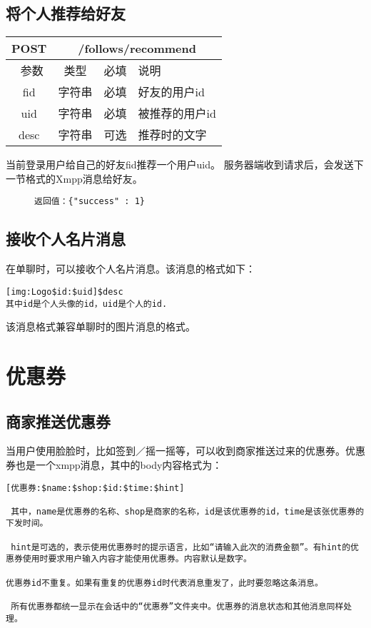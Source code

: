 \subsection{ 将个人推荐给好友}
\begin{table}[H]
   \begin{center}
\begin{tabular}{|c|c|c|p{12cm}|}
\hline
POST & \multicolumn{3}{|c|}{/follows/recommend} \\
\hline\hline
 \  参数  & 类型 & 必填 &  说明  \\
\hline
 fid  & 字符串 & 必填 &  好友的用户id\\
 \hline
 uid  & 字符串 & 必填 &  被推荐的用户id\\
\hline
 desc  & 字符串 & 可选 &  推荐时的文字\\
\hline
\end{tabular}
   \end{center}
\end{table}
当前登录用户给自己的好友fid推荐一个用户uid。
服务器端收到请求后，会发送下一节格式的Xmpp消息给好友。

\begin{figure}[H]
\begin{verbatim}
返回值：{"success" : 1}
\end{verbatim}
\end{figure}


\subsection{接收个人名片消息}
在单聊时，可以接收个人名片消息。该消息的格式如下：
\begin{verbatim}
[img:Logo$id:$uid]$desc
其中id是个人头像的id，uid是个人的id.
\end{verbatim}
该消息格式兼容单聊时的图片消息的格式。


\section{优惠券}

\subsection{商家推送优惠券}
当用户使用脸脸时，比如签到／摇一摇等，可以收到商家推送过来的优惠券。优惠券也是一个xmpp消息，其中的body内容格式为：

\begin{verbatim}
[优惠券:$name:$shop:$id:$time:$hint]

 其中，name是优惠券的名称、shop是商家的名称，id是该优惠券的id，time是该张优惠券的下发时间。
 
 hint是可选的，表示使用优惠券时的提示语言，比如“请输入此次的消费金额”。有hint的优惠券使用时要求用户输入内容才能使用优惠券。内容默认是数字。
 
优惠券id不重复。如果有重复的优惠券id时代表消息重发了，此时要忽略这条消息。
 
 所有优惠券都统一显示在会话中的“优惠券”文件夹中。优惠券的消息状态和其他消息同样处理。
\end{verbatim}


